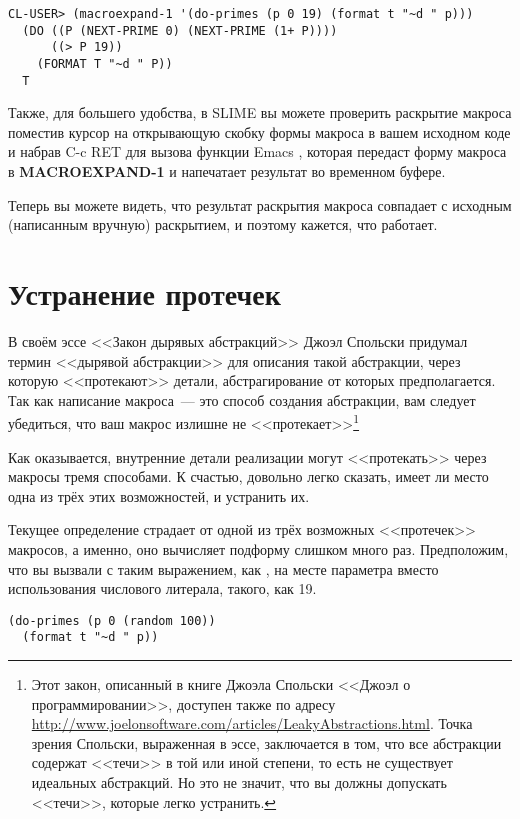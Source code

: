 \begin{lstlisting}[style=lisprepl]
  CL-USER> (macroexpand-1 '(do-primes (p 0 19) (format t "~d " p)))
  (DO ((P (NEXT-PRIME 0) (NEXT-PRIME (1+ P))))
      ((> P 19))
    (FORMAT T "~d " P))
  T
\end{lstlisting}

Также, для большего удобства, в SLIME вы можете проверить раскрытие макроса поместив
курсор на открывающую скобку формы макроса в вашем исходном коде и набрав C-c RET для
вызова функции Emacs , которая передаст форму макроса в
\textbf{MACROEXPAND-1} и напечатает результат во временном буфере.

Теперь вы можете видеть, что результат раскрытия макроса совпадает с исходным (написанным
вручную) раскрытием, и поэтому кажется, что  работает.

\section{Устранение протечек}

В своём эссе <<Закон дырявых абстракций>> Джоэл Спольски придумал термин <<дырявой
абстракции>> для описания такой абстракции, через которую <<протекают>> детали,
абстрагирование от которых предполагается. Так как написание макроса~--- это способ
создания абстракции, вам следует убедиться, что ваш макрос излишне не
<<протекает>>\footnote{Этот закон, описанный в книге Джоэла Спольски <<Джоэл о
  программировании>>, доступен также по адресу
  \url{http://www.joelonsoftware.com/articles/LeakyAbstractions.html}. Точка зрения
  Спольски, выраженная в эссе, заключается в том, что все абстракции содержат <<течи>> в той
  или иной степени, то есть не существует идеальных абстракций. Но это не значит, что вы
  должны допускать <<течи>>, которые легко устранить.}

Как оказывается, внутренние детали реализации могут <<протекать>> через макросы тремя
способами. К счастью, довольно легко сказать, имеет ли место одна из трёх этих
возможностей, и устранить их.

Текущее определение страдает от одной из трёх возможных <<протечек>> макросов, а именно, оно
вычисляет подформу  слишком много раз. Предположим, что вы вызвали
 с таким выражением, как , на месте параметра
 вместо использования числового литерала, такого, как 19.

\begin{lstlisting}
(do-primes (p 0 (random 100))
  (format t "~d " p))
\end{lstlisting}

